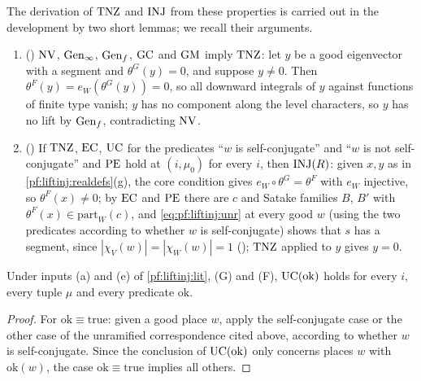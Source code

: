 The derivation of $\mathrm{TNZ}$ and $\mathrm{INJ}$ from these properties is carried out in the development by two short lemmas; we recall their
arguments.
\begin{enumerate}[label=(T\arabic*)]
\item\label{pf:liftinj:T1} () $\mathrm{NV}$, $\mathrm{Gen}_\infty$, $\mathrm{Gen}_f$,
$\mathrm{GC}$ and $\mathrm{GM}$ imply $\mathrm{TNZ}$: let $y$ be a good eigenvector with a segment and $\theta^G(y)=0$, and suppose $y\ne0$. Then
$\theta^F(y)=e_W(\theta^G(y))=0$, so all downward integrals of $y$ against functions of finite type vanish; $y$ has no component along the level
characters, so $y$ has no lift by $\mathrm{Gen}_f$, contradicting $\mathrm{NV}$.
\item\label{pf:liftinj:T2} () If $\mathrm{TNZ}$, $\mathrm{EC}$, $\mathrm{UC}$ for the
predicates ``$w$ is self-conjugate'' and ``$w$ is not self-conjugate'' and $\mathrm{PE}$ hold at $(i,\mu_0)$ for every $i$, then $\mathrm{INJ}(R)$:
given $x,y$ as in \cref{pf:liftinj:realdefs}(g), the core condition gives $e_W\circ\theta^G=\theta^F$ with $e_W$ injective, so $\theta^F(x)\ne0$; by
$\mathrm{EC}$ and $\mathrm{PE}$ there are $c$ and Satake families $B$, $B'$ with $\theta^F(x)\in\mathrm{part}_W(c)$, and \eqref{eq:pf:liftinj:unr}
at every good $w$ (using the two predicates according to whether $w$ is self-conjugate) shows that $s$ has a segment, since
$|\chi_V(w)|=|\chi_W(w)|=1$ (); $\mathrm{TNZ}$ applied to $y$ gives $y=0$.
\end{enumerate}

\begin{lemma}\label{pf:liftinj:ucall}
Under inputs (a) and (e) of \cref{pf:liftinj:lit}, (G) and (F), $\mathrm{UC}(\mathrm{ok})$ holds for every $i$, every tuple $\mu$ and every predicate
$\mathrm{ok}$.
\end{lemma}

\begin{proof}
For $\mathrm{ok}\equiv\mathrm{true}$: given a good place $w$, apply the self-conjugate case or the other case of the unramified correspondence cited
above, according to whether $w$ is self-conjugate. Since the conclusion of $\mathrm{UC}(\mathrm{ok})$ only concerns places $w$ with $\mathrm{ok}(w)$,
the case $\mathrm{ok}\equiv\mathrm{true}$ implies all others.
\end{proof}

